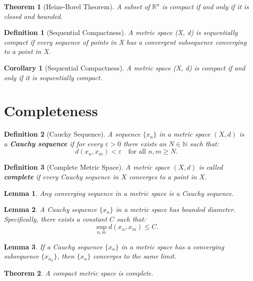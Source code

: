 \documentclass{article}
\newtheorem{definition}{Definition}
\newtheorem{lemma}{Lemma}
\newtheorem{theorem}{Theorem}
\newtheorem{corollary}{Corollary}
\begin{document}
\begin{theorem}[Heine-Borel Theorem]
A subset of $\mathbb{R}^n$ is compact if and only if it is closed and bounded.
\end{theorem}

\begin{definition} [Sequential Compactness]
A metric space (X, d) is sequentially compact if every sequence of points in X has a convergent subsequence converging to a point in X.
\end{definition}

\begin{corollary} [Sequential Compactness]
A metric space (X, d) is compact if and only if it is sequentially compact.
\end{corollary}

\section*{Completeness}

\begin{definition}[Cauchy Sequence]
A sequence $\{x_n\}$ in a metric space $(X, d)$ is a \textbf{Cauchy sequence} if for every $\varepsilon > 0$ there exists an $N \in \mathbb{N}$ such that:
\[
d(x_n, x_m) < \varepsilon \quad \text{for all } n, m \geq N.
\]
\end{definition}

\begin{definition}[Complete Metric Space]
A metric space $(X, d)$ is called \textbf{complete} if every Cauchy sequence in $X$ converges to a point in $X$.
\end{definition}

\begin{lemma}
Any converging sequence in a metric space is a Cauchy sequence.
\end{lemma}

\begin{lemma}
A Cauchy sequence $\{x_n\}$ in a metric space has bounded diameter. Specifically, there exists a constant $C$ such that:
\[
\sup_{n,m} d(x_n, x_m) \leq C.
\]
\end{lemma}

\begin{lemma}
If a Cauchy sequence $\{x_n\}$ in a metric space has a converging subsequence $\{x_{n_k}\}$, then $\{x_n\}$ converges to the same limit.
\end{lemma}

\begin{theorem}
A compact metric space is complete.
\end{theorem}
\end{document}
